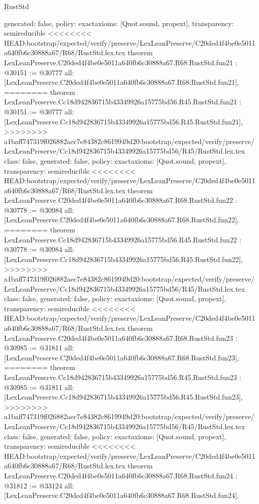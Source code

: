 \begin{lexlean}{RustStd}
\begin{coremodule}
{\begin{coremodule}
{{{{{{{{{{{{{{{{{{{{{{{{  generated: false,
  policy: exact{axioms: [Quot.sound, propext]},
  transparency: semireducible
}
<<<<<<<< HEAD:bootstrap/expected/verify/preserve/LexLeanPreserve/C20ded4f4be0e5011a640fb6c30888a67/R68/RustStd.lex.tex
theorem LexLeanPreserve.C20ded4f4be0e5011a640fb6c30888a67.R68.RustStd.fun21 : @30151 := @30777 {
  all: [LexLeanPreserve.C20ded4f4be0e5011a640fb6c30888a67.R68.RustStd.fun21],
========
theorem LexLeanPreserve.Cc18d942836715b43349926a15775bd56.R45.RustStd.fun21 : @30151 := @30777 {
  all: [LexLeanPreserve.Cc18d942836715b43349926a15775bd56.R45.RustStd.fun21],
>>>>>>>> a1baff747319f026882aec7e84382c8619949d20:bootstrap/expected/verify/preserve/LexLeanPreserve/Cc18d942836715b43349926a15775bd56/R45/RustStd.lex.tex
  class: false,
  generated: false,
  policy: exact{axioms: [Quot.sound, propext]},
  transparency: semireducible
}
<<<<<<<< HEAD:bootstrap/expected/verify/preserve/LexLeanPreserve/C20ded4f4be0e5011a640fb6c30888a67/R68/RustStd.lex.tex
theorem LexLeanPreserve.C20ded4f4be0e5011a640fb6c30888a67.R68.RustStd.fun22 : @30778 := @30984 {
  all: [LexLeanPreserve.C20ded4f4be0e5011a640fb6c30888a67.R68.RustStd.fun22],
========
theorem LexLeanPreserve.Cc18d942836715b43349926a15775bd56.R45.RustStd.fun22 : @30778 := @30984 {
  all: [LexLeanPreserve.Cc18d942836715b43349926a15775bd56.R45.RustStd.fun22],
>>>>>>>> a1baff747319f026882aec7e84382c8619949d20:bootstrap/expected/verify/preserve/LexLeanPreserve/Cc18d942836715b43349926a15775bd56/R45/RustStd.lex.tex
  class: false,
  generated: false,
  policy: exact{axioms: [Quot.sound, propext]},
  transparency: semireducible
}
<<<<<<<< HEAD:bootstrap/expected/verify/preserve/LexLeanPreserve/C20ded4f4be0e5011a640fb6c30888a67/R68/RustStd.lex.tex
theorem LexLeanPreserve.C20ded4f4be0e5011a640fb6c30888a67.R68.RustStd.fun23 : @30985 := @31811 {
  all: [LexLeanPreserve.C20ded4f4be0e5011a640fb6c30888a67.R68.RustStd.fun23],
========
theorem LexLeanPreserve.Cc18d942836715b43349926a15775bd56.R45.RustStd.fun23 : @30985 := @31811 {
  all: [LexLeanPreserve.Cc18d942836715b43349926a15775bd56.R45.RustStd.fun23],
>>>>>>>> a1baff747319f026882aec7e84382c8619949d20:bootstrap/expected/verify/preserve/LexLeanPreserve/Cc18d942836715b43349926a15775bd56/R45/RustStd.lex.tex
  class: false,
  generated: false,
  policy: exact{axioms: [Quot.sound, propext]},
  transparency: semireducible
}
<<<<<<<< HEAD:bootstrap/expected/verify/preserve/LexLeanPreserve/C20ded4f4be0e5011a640fb6c30888a67/R68/RustStd.lex.tex
theorem LexLeanPreserve.C20ded4f4be0e5011a640fb6c30888a67.R68.RustStd.fun24 : @31812 := @33124 {
  all: [LexLeanPreserve.C20ded4f4be0e5011a640fb6c30888a67.R68.RustStd.fun24],
}}}}}}}}}}}}}}}}}}}}}}}}}}}
\end{coremodule}}
\end{coremodule}
\end{lexlean}
